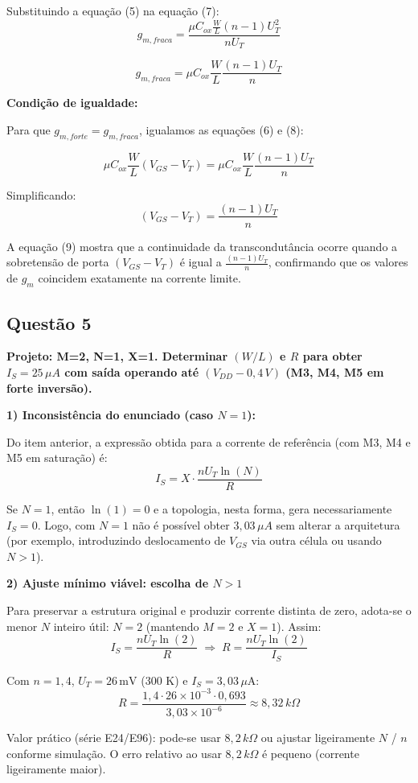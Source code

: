 ﻿\documentclass[12pt,a4paper]{article}
\begin{document}
Substituindo a equação (5) na equação (7):
$$g_{m,fraca} = \frac{\mu C_{ox} \frac{W}{L} (n-1) U_T^2}{nU_T}$$

$$g_{m,fraca} = \mu C_{ox} \frac{W}{L} \frac{(n-1)U_T}{n} $$

\textbf{Condição de igualdade:}

Para que $g_{m,forte} = g_{m,fraca}$, igualamos as equações (6) e (8):

$$\mu C_{ox} \frac{W}{L} (V_{GS} - V_T) = \mu C_{ox} \frac{W}{L} \frac{(n-1)U_T}{n}$$

Simplificando:
$$(V_{GS} - V_T) = \frac{(n-1)U_T}{n} $$

A equação (9) mostra que a continuidade da transcondutância ocorre quando a sobretensão de porta $(V_{GS} - V_T)$ é igual a $\frac{(n-1)U_T}{n}$, confirmando que os valores de $g_m$ coincidem exatamente na corrente limite.



\subsection*{Questão 5}
	\textbf{Projeto: M=2, N=1, X=1. Determinar $(W/L)$ e $R$ para obter $I_S = 25\,\mu A$ com saída operando até $(V_{DD} - 0{,}4\,V)$ (M3, M4, M5 em forte inversão).}

	\textbf{1) Inconsistência do enunciado (caso $N=1$):}

Do item anterior, a expressão obtida para a corrente de referência (com M3, M4 e M5 em saturação) é:
$$ I_S = X \cdot \frac{n U_T \ln(N)}{R} $$

Se $N = 1$, então $\ln(1)=0$ e a topologia, nesta forma, gera necessariamente $I_S = 0$. Logo, com $N=1$ não é possível obter $3{,}03\,\mu A$ sem alterar a arquitetura (por exemplo, introduzindo deslocamento de $V_{GS}$ via outra célula ou usando $N>1$).

	\textbf{2) Ajuste mínimo viável: escolha de $N>1$}

Para preservar a estrutura original e produzir corrente distinta de zero, adota-se o menor $N$ inteiro útil: $N=2$ (mantendo $M=2$ e $X=1$). Assim:
$$ I_S = \frac{n U_T \ln(2)}{R} \;\Longrightarrow\; R = \frac{n U_T \ln(2)}{I_S} $$

Com $n = 1{,}4$, $U_T = 26\,\text{mV}$ (300 K) e $I_S = 3{,}03\,\mu\text{A}$:
$$ R = \frac{1{,}4 \cdot 26\times10^{-3} \cdot 0{,}693}{3{,}03\times10^{-6}} \approx 8{,}32\,k\Omega $$

Valor prático (série E24/E96): pode-se usar $8{,}2\,k\Omega$ ou ajustar ligeiramente $N$ / $n$ conforme simulação. O erro relativo ao usar $8{,}2\,k\Omega$ é pequeno (corrente ligeiramente maior).
\end{document}
